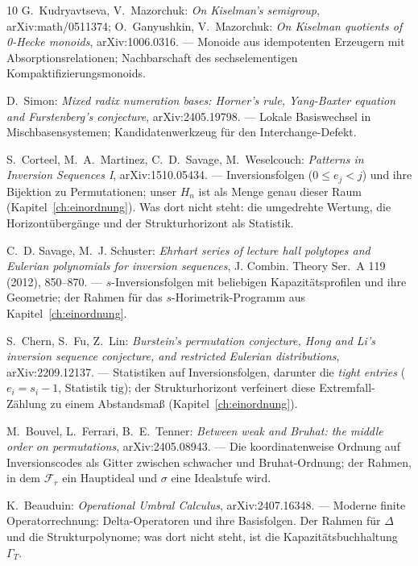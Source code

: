 \begin{thebibliography}{10}
 G.~Kudryavtseva, V.~Mazorchuk: \emph{On Kiselman's
semigroup}, arXiv:math/0511374; O.~Ganyushkin, V.~Mazorchuk:
\emph{On Kiselman quotients of 0-Hecke monoids}, arXiv:1006.0316.
--- Monoide aus idempotenten Erzeugern mit Absorptionsrelationen;
Nachbarschaft des sechselementigen Kompaktifizierungsmonoids.

 D.~Simon: \emph{Mixed radix numeration bases:
Horner's rule, Yang-Baxter equation and Furstenberg's conjecture},
arXiv:2405.19798.
--- Lokale Basiswechsel in Mischbasensystemen; Kandidatenwerkzeug
für den Interchange-Defekt.

 S.~Corteel, M.~A.~Martinez, C.~D.~Savage,
M.~Weselcouch: \emph{Patterns in Inversion Sequences I},
arXiv:1510.05434.
--- Inversionsfolgen ($0\le e_j<j$) und ihre Bijektion zu
Permutationen; unser $H_n$ ist als Menge genau dieser Raum
(Kapitel~\ref{ch:einordnung}). Was dort nicht steht: die umgedrehte
Wertung, die Horizontübergänge und der Strukturhorizont als
Statistik.

 C.~D. Savage, M.~J. Schuster: \emph{Ehrhart
series of lecture hall polytopes and Eulerian polynomials for
inversion sequences}, J. Combin. Theory Ser.~A 119 (2012),
850--870.
--- $s$-Inversionsfolgen mit beliebigen Kapazitätsprofilen und ihre
Geometrie; der Rahmen für das $s$-Horimetrik-Programm aus
Kapitel~\ref{ch:einordnung}.

 S.~Chern, S.~Fu, Z.~Lin: \emph{Burstein's
permutation conjecture, Hong and Li's inversion sequence
conjecture, and restricted Eulerian distributions},
arXiv:2209.12137.
--- Statistiken auf Inversionsfolgen, darunter die \emph{tight
entries} ($e_i=s_i-1$, Statistik $\mathrm{tig}$); der
Strukturhorizont verfeinert diese Extremfall-Zählung zu einem
Abstandsmaß (Kapitel~\ref{ch:einordnung}).

 M.~Bouvel, L.~Ferrari, B.~E.~Tenner:
\emph{Between weak and Bruhat: the middle order on permutations},
arXiv:2405.08943.
--- Die koordinatenweise Ordnung auf Inversionscodes als Gitter
zwischen schwacher und Bruhat-Ordnung; der Rahmen, in dem
$\mathcal F_r$ ein Hauptideal und $\sigma$ eine Idealstufe wird.

 K.~Beauduin: \emph{Operational Umbral Calculus},
arXiv:2407.16348.
--- Moderne finite Operatorrechnung: Delta-Operatoren und ihre
Basisfolgen. Der Rahmen für $\Delta$ und die Strukturpolynome; was
dort nicht steht, ist die Kapazitätsbuchhaltung $\Gamma_T$.


\end{thebibliography}
